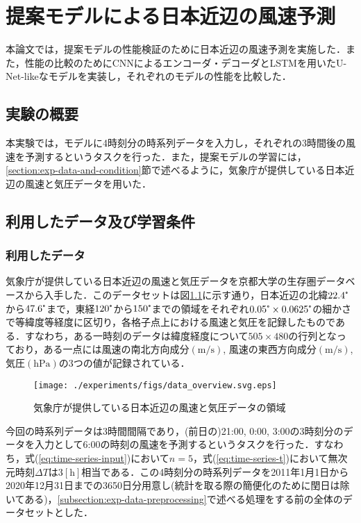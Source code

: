 \chapter{提案モデルによる日本近辺の風速予測\label{chap:experiments}}
本論文では，提案モデルの性能検証のために日本近辺の風速予測を実施した．また，性能の比較のためにCNNによるエンコーダ・デコーダとLSTMを用いたU-Net-likeなモデルを実装し，それぞれのモデルの性能を比較した．

\section{実験の概要 \label{section:exp-overview}}
本実験では，モデルに4時刻分の時系列データを入力し，それぞれの3時間後の風速を予測するというタスクを行った．また，提案モデルの学習には，\ref{section:exp-data-and-condition}節で述べるように，気象庁が提供している日本近辺の風速と気圧データを用いた．

\section{利用したデータ及び学習条件 \label{section:exp-data-and-condition}}
\subsection{利用したデータ \label{subsection:exp-data}}
気象庁が提供している日本近辺の風速と気圧データを京都大学の生存圏データベース\cite{Seizonken2004}から入手した．このデータセットは図\ref{fig:exp-data-overview}に示す通り，日本近辺の北緯$22.4\tcdegree$から$47.6\tcdegree$まで，東経$120\tcdegree$から$150\tcdegree$までの領域をそれぞれ$0.05\tcdegree \times 0.0625\tcdegree$の細かさで等緯度等経度に区切り，各格子点上における風速と気圧を記録したものである\cite{JMBSC2022}．すなわち，ある一時刻のデータは緯度経度について$505 \times 480$の行列となっており，ある一点には風速の南北方向成分$(\mathrm{m/s})$, 風速の東西方向成分$(\mathrm{m/s})$, 気圧$(\mathrm{hPa})$の3つの値が記録されている．
\begin{figure}[bp]
  \centering
  \texttt{[image: ./experiments/figs/data\_overview.svg.eps]}
  \caption{気象庁が提供している日本近辺の風速と気圧データの領域}
  \label{fig:exp-data-overview}
\end{figure}

今回の時系列データは3時間間隔であり，(前日の)21:00, 0:00, 3:00の3時刻分のデータを入力として6:00の時刻の風速を予測するというタスクを行った．すなわち，式(\ref{eq:time-series-input})において$n=5$，式(\ref{eq:time-series-t})において無次元時刻$\Delta T$は$3[\mathrm{h}]$相当である．この4時刻分の時系列データを2011年1月1日から2020年12月31日までの3650日分用意し(統計を取る際の簡便化のために閏日は除いてある)，\ref{subsection:exp-data-preprocessing}で述べる処理をする前の全体のデータセットとした．

